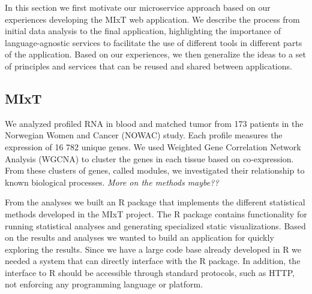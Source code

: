 In this section we first motivate our microservice approach based on our
experiences developing the MIxT web application.
We describe the process from initial data analysis to the final application,
highlighting the importance
of language-agnostic services to facilitate the use of different tools in
different parts of the application. 
Based on our experiences, we then generalize the ideas to a set
of principles and services that can be reused and shared between applications. 




\subsection*{MIxT} 
We analyzed profiled RNA in blood and matched tumor from 173 patients in the
Norwegian Women and Cancer (NOWAC) study. Each profile measures the expression
of 16 782 unique genes. We used Weighted Gene Correlation Network Analysis
(WGCNA)\cite{langfelder2008wgcna} to cluster the genes in each tissue
based on co-expression. From these clusters of genes, called modules, we
investigated their relationship to known biological processes.
\emph{More on the methods maybe??}

From the analyses we built an R package\cite{mixt-r-package} that
implements the different statistical methods developed in the MIxT project. 
The R package contains functionality for running statistical analyses and
generating specialized static visualizations. Based on the results and analyses
we wanted to build an application for quickly exploring the results. Since we
have a large code base already developed in R we needed a system that can
directly interface with the R package. 
In addition, the interface to R should be accessible through standard protocols,
such as HTTP, not enforcing any programming language or platform. 

